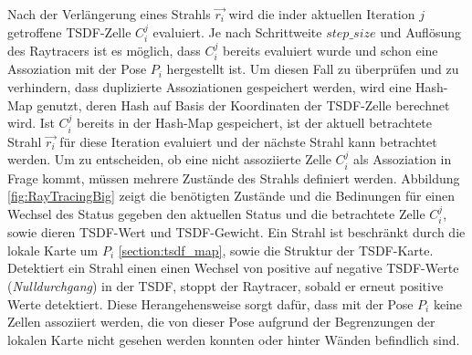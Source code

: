 Nach der Verlängerung eines Strahls $\vec{r_i}$ wird die inder aktuellen Iteration $j$ getroffene TSDF-Zelle $C_i^j$ evaluiert. Je nach Schrittweite $step\_size$ und Auflösung des Raytracers ist es möglich, dass $C_i^j$ bereits evaluiert wurde und schon eine Assoziation mit der Pose $P_i$ hergestellt ist. Um diesen Fall zu überprüfen und zu verhindern, dass duplizierte Assoziationen gespeichert werden, wird eine Hash-Map genutzt, deren Hash auf Basis der Koordinaten der TSDF-Zelle berechnet wird. Ist $C_i^j$ bereits in der Hash-Map gespeichert, ist der aktuell betrachtete Strahl $\vec{r_i}$ für diese Iteration evaluiert und der nächste Strahl kann betrachtet werden. Um zu entscheiden, ob eine nicht assoziierte Zelle $C_i^j$ als Assoziation in Frage kommt, müssen mehrere Zustände des Strahls definiert werden. Abbildung \ref{fig:RayTracingBig} zeigt die benötigten Zustände und die Bedinungen für einen Wechsel des Status gegeben den aktuellen Status und die betrachtete Zelle $C_i^j$, sowie dieren TSDF-Wert und TSDF-Gewicht. Ein Strahl ist beschränkt durch die lokale Karte um $P_i$ \ref{section:tsdf_map}, sowie die Struktur der TSDF-Karte. Detektiert ein Strahl einen einen Wechsel von positive auf negative TSDF-Werte (\emph{Nulldurchgang}) in der TSDF, stoppt der Raytracer, sobald er erneut positive Werte detektiert. Diese Herangehensweise sorgt dafür, dass mit der Pose $P_i$ keine Zellen assoziiert werden, die von dieser Pose aufgrund der Begrenzungen der lokalen Karte nicht gesehen werden konnten oder hinter Wänden befindlich sind.

